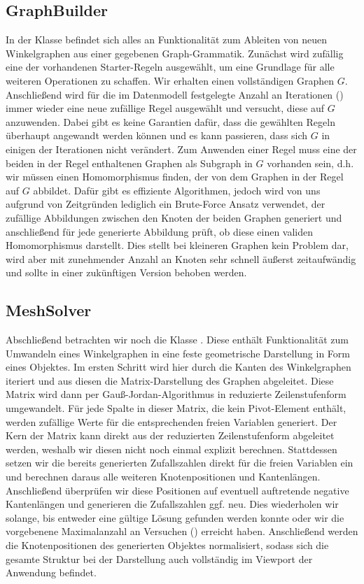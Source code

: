 \subsection{GraphBuilder}
In der  Klasse befindet sich alles an Funktionalität zum Ableiten von neuen Winkelgraphen aus einer gegebenen
Graph-Grammatik. Zunächst wird zufällig eine der vorhandenen Starter-Regeln ausgewählt, um eine Grundlage für alle weiteren Operationen
zu schaffen. Wir erhalten einen vollständigen Graphen \(G\). Anschließend wird für die im Datenmodell festgelegte Anzahl an Iterationen
() immer wieder eine neue zufällige Regel ausgewählt und versucht, diese auf \(G\) anzuwenden. Dabei gibt es keine Garantien
dafür, dass die gewählten Regeln überhaupt angewandt werden können und es kann passieren, dass sich \(G\) in einigen der Iterationen
nicht verändert. Zum Anwenden einer Regel muss eine der beiden in der Regel enthaltenen Graphen als Subgraph in \(G\) vorhanden sein,
d.h. wir müssen einen Homomorphismus finden, der von dem Graphen in der Regel auf \(G\) abbildet. Dafür gibt es effiziente Algorithmen,
jedoch wird von uns aufgrund von Zeitgründen lediglich ein Brute-Force Ansatz verwendet, der zufällige Abbildungen zwischen den Knoten
der beiden Graphen generiert und anschließend für jede generierte Abbildung prüft, ob diese einen validen Homomorphismus darstellt.
Dies stellt bei kleineren Graphen kein Problem dar, wird aber mit zunehmender Anzahl an Knoten sehr schnell äußerst zeitaufwändig und
sollte in einer zukünftigen Version behoben werden.

\subsection{MeshSolver}
Abschließend betrachten wir noch die Klasse . Diese enthält Funktionalität zum Umwandeln eines Winkelgraphen in eine
feste geometrische Darstellung in Form eines  Objektes. Im ersten Schritt wird hier durch die Kanten des
Winkelgraphen iteriert und aus diesen die Matrix-Darstellung des Graphen abgeleitet. Diese Matrix wird dann per Gauß-Jordan-Algorithmus \cite{47_meyer}
in reduzierte Zeilenstufenform umgewandelt. Für jede Spalte in dieser Matrix, die kein Pivot-Element enthält, werden zufällige
Werte für die entsprechenden freien Variablen generiert. Der Kern der Matrix kann direkt aus der reduzierten Zeilenstufenform
abgeleitet werden, weshalb wir diesen nicht noch einmal explizit berechnen. Stattdessen setzen wir die bereits generierten Zufallszahlen
direkt für die freien Variablen ein und berechnen daraus alle weiteren Knotenpositionen und Kantenlängen. Anschließend überprüfen wir
diese Positionen auf eventuell auftretende negative Kantenlängen und generieren die Zufallszahlen ggf. neu. Dies wiederholen wir solange,
bis entweder eine gültige Lösung gefunden werden konnte oder wir die vorgebenene Maximalanzahl an Versuchen () erreicht haben.
Anschließend werden die Knotenpositionen des generierten  Objektes normalisiert, sodass sich die gesamte Struktur
bei der Darstellung auch vollständig im Viewport der Anwendung befindet.

